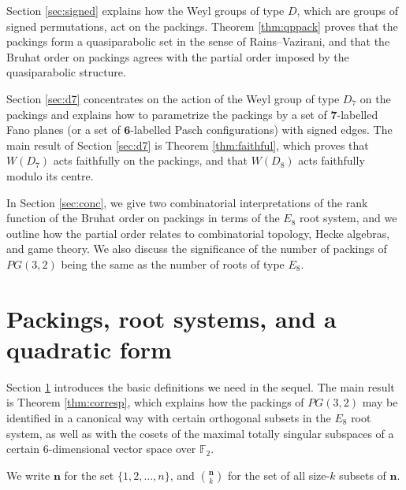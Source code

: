 \documentclass{amsart}
\theoremstyle{plain}
\theoremstyle{definition}
\theoremstyle{remark}
\numberwithin{equation}{section}
\newcommand{\F}{{\mathbb F}}
\newcommand{\bfn}{\mathbf{n}}
\newcommand{\six}{{\mathbf 6}}
\newcommand{\seven}{{\mathbf 7}}
\begin{document}
Section \ref{sec:signed} explains how the Weyl groups of type $D$, which are groups of signed permutations, 
act on the packings. Theorem \ref{thm:qppack} proves that the packings form a quasiparabolic set in the sense of
Rains--Vazirani, and that the Bruhat order on packings agrees with the partial order imposed by the
quasiparabolic structure.

Section \ref{sec:d7} concentrates on the action of the Weyl group of type $D_7$ on the packings and explains
how to parametrize the packings by a set of $\seven$-labelled Fano planes (or a set of $\six$-labelled Pasch
configurations) with signed edges. The main result of Section \ref{sec:d7} is Theorem \ref{thm:faithful}, 
which proves that $W(D_7)$ acts faithfully on the packings, and that $W(D_8)$ acts faithfully modulo its centre.

In Section \ref{sec:conc}, we give two combinatorial interpretations of the rank function of the Bruhat order
on packings in terms of the $E_8$ root system, and we outline how the partial order relates to combinatorial 
topology, Hecke algebras, and game theory. We also discuss the significance of the number of packings of 
$PG(3, 2)$ being the same as the number of roots of type $E_8$.

\section{Packings, root systems, and a quadratic form}\label{sec:prq}

Section \ref{sec:prq} introduces the basic definitions we need in the sequel. The main result is Theorem 
\ref{thm:corresp}, which explains how the packings of $PG(3, 2)$ may be identified in a canonical way with
certain orthogonal subsets in the $E_8$ root system, as well as with the cosets of the maximal totally singular
subspaces of a certain $6$-dimensional vector space over $\F_2$.

We write $\bfn$ for the set $\{1, 2, \ldots, n\}$, and $\binom{\bfn}{k}$ for the set of all size-$k$ subsets of 
$\bfn$. 
\end{document}
